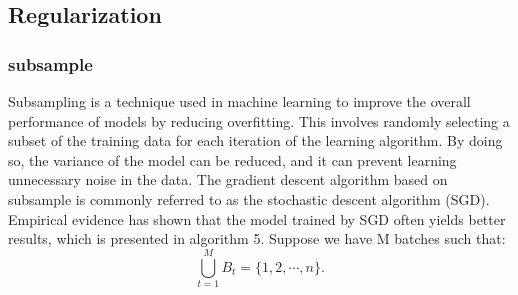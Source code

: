 \subsection{Regularization}
\subsubsection{subsample}
Subsampling is a technique used in machine learning to improve the overall performance of models by reducing overfitting. This involves randomly selecting a subset of the training data for each iteration of the learning algorithm. By doing so, the variance of the model can be reduced, and it can prevent learning unnecessary noise in the data. The gradient descent algorithm based on subsample is commonly referred to as the stochastic descent algorithm (SGD). Empirical evidence has shown that the model trained by SGD often yields better results, which is presented in algorithm 5. Suppose we have M batches such that:
$$
\bigcup_{t=1}^M B_t = \{1,2,\cdots,n\}.
$$

